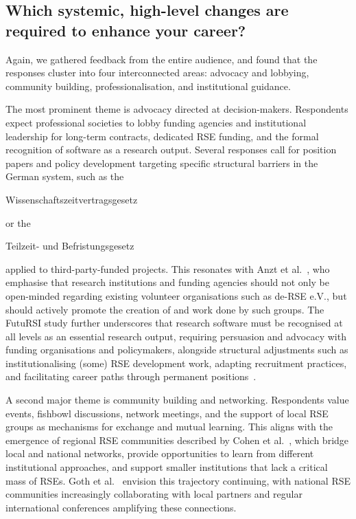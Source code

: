 \documentclass{eceasst}
\newenvironment{de}{\begin{otherlanguage}{ngerman}}{\end{otherlanguage}}
\begin{document}
\subsection{Which systemic, high-level changes are required to enhance your career?}
Again, we gathered feedback from the entire audience, and found that the responses cluster into four interconnected areas: advocacy and lobbying, community building, professionalisation, and institutional guidance.

The most prominent theme is advocacy directed at decision-makers.
Respondents expect professional societies to lobby funding agencies and institutional leadership for long-term contracts, dedicated RSE funding, and the formal recognition of software as a research output.
Several responses call for position papers and policy development targeting specific structural barriers in the German system, such as the \begin{de}Wissenschaftszeitvertragsgesetz\end{de} or the \begin{de}Teilzeit- und Befristungsgesetz\end{de} applied to third-party-funded projects.
This resonates with Anzt et al. \cite{Anzt:2020}, who emphasise that research institutions and funding agencies should not only be open-minded regarding existing volunteer organisations such as de-RSE e.V., but should actively promote the creation of and work done by such groups.
The FutuRSI study further underscores that research software must be recognised at all levels as an essential research output, requiring persuasion and advocacy with funding organisations and policymakers, alongside structural adjustments such as institutionalising (some) RSE development work, adapting recruitment practices, and facilitating career paths through permanent positions \cite{Mannseicher:2025a}.

A second major theme is community building and networking.
Respondents value events, fishbowl discussions, network meetings, and the support of local RSE groups as mechanisms for exchange and mutual learning.
This aligns with the emergence of regional RSE communities described by Cohen et al. \cite{Cohen:2021}, which bridge local and national networks, provide opportunities to learn from different institutional approaches, and support smaller institutions that lack a critical mass of RSEs.
Goth et al. \cite{Goth:2025b} envision this trajectory continuing, with national RSE communities increasingly collaborating with local partners and regular international conferences amplifying these connections.
\end{document}
